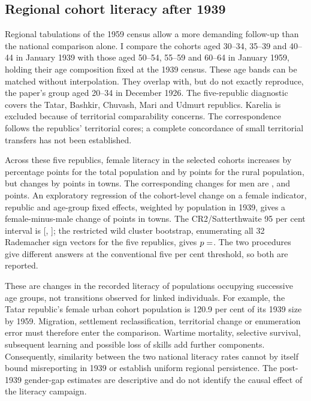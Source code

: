 \subsection*{Regional cohort literacy after 1939}

Regional tabulations of the 1959 census allow a more demanding follow-up
than the national comparison alone. I compare the cohorts aged 30--34,
35--39 and 40--44 in January 1939 with those aged 50--54, 55--59 and 60--64
in January 1959, holding their age composition fixed at the 1939 census.
These age bands can be matched without interpolation. They overlap with,
but do not exactly reproduce, the paper's group aged 20--34 in December
1926. The five-republic diagnostic covers the Tatar, Bashkir, Chuvash,
Mari and Udmurt republics. Karelia is excluded because of territorial
comparability concerns. The correspondence follows the republics'
territorial cores; a complete concordance of small territorial transfers
has not been established.

Across these five republics, female literacy in the selected cohorts
increases by  percentage points for the total population and by 
points for the rural population, but changes by  points in towns.
The corresponding changes for men are ,  and  points.
An exploratory regression of the cohort-level change on a female
indicator, republic and age-group fixed effects, weighted by population
in 1939, gives a female-minus-male change of  points in towns.
The CR2/Satterthwaite 95 per cent interval is [, ]; the
restricted wild cluster bootstrap, enumerating all 32 Rademacher sign
vectors for the five republics, gives $p=\SN{urban.wcr_p}$. The two procedures give different answers at the conventional five per cent threshold, so both are reported.

These are changes in the recorded literacy of populations occupying
successive age groups, not transitions observed for linked individuals.
For example, the Tatar republic's female urban cohort population is
120.9 per cent of its 1939 size by 1959. Migration, settlement
reclassification, territorial change or enumeration error must therefore
enter the comparison. Wartime mortality, selective survival, subsequent
learning and possible loss of skills add further components.
Consequently, similarity between the two national literacy rates cannot
by itself bound misreporting in 1939 or establish uniform regional
persistence. The post-1939 gender-gap estimates are descriptive and do
not identify the causal effect of the literacy campaign.

